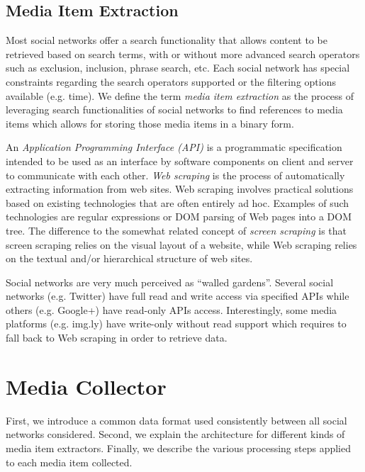 \documentclass{acm_proc_article-sp}
\let\oldemph\emph
\renewcommand{\emph}[1]{\oldemph{\fontsize{9}{9}\selectfont #1}}
\begin{document}
\subsection{Media Item Extraction}
Most social networks offer a search functionality that allows content to be retrieved based on search terms, with or without more advanced
search operators such as exclusion, inclusion, phrase search, etc. Each social network has special constraints regarding the search operators
supported or the filtering options available (e.g. time). We define the term \emph{media item extraction} as the process of leveraging
search functionalities of social networks to find references to media items which allows for storing those media items in a binary form.

An \emph{Application Programming Interface (API)} is a programmatic specification intended to be used as an interface by software components on client and server to communicate with each other. \emph{Web scraping} is the process of automatically extracting information from web sites. Web scraping involves practical solutions based on existing technologies that are often entirely ad hoc. Examples of such technologies are regular expressions or DOM parsing of Web pages into a DOM tree. The difference to the somewhat related concept of \emph{screen scraping} is that screen scraping relies on the visual layout of a website, while Web scraping relies on the textual and/or hierarchical structure of web sites.

Social networks are very much perceived as ``walled gardens''. Several social networks (e.g. Twitter) have full read and write access via specified APIs while others (e.g. Google+) have read-only APIs access. Interestingly, some media platforms (e.g. img.ly) have write-only without read support which requires to fall back to Web scraping in order to retrieve data.


\section{Media Collector}                                                   \label{sec:media-collector}
First, we introduce a common data format used consistently between all social networks considered.
Second, we explain the architecture for different kinds of media item extractors. Finally,
we describe the various processing steps applied to each media item collected.
\end{document}
